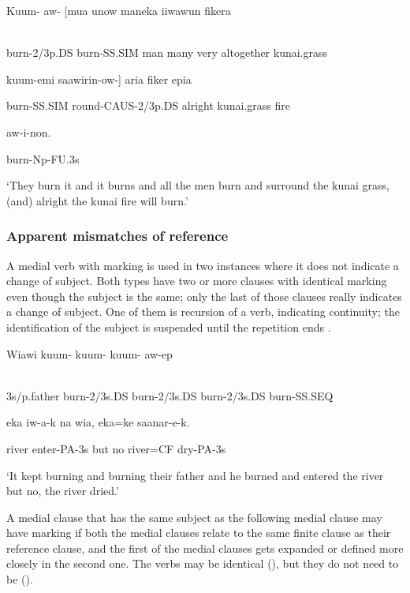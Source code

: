 \ea%
\label{ex:x1479}
\gll Kuum-  aw-  [mua  unow  maneka  iiwawun  fikera \\
      \\
\glt
\z

burn-2/3p.DS  burn-SS.SIM  man  many  very  altogether  kunai.grass

kuum-emi  saawirin-ow-]  aria  fiker  epia

burn-SS.SIM  round-CAUS-2/3p.DS  alright  kunai.grass  fire

aw-i-non.

burn-Np-FU.3s

`They burn it and it burns and all the men burn and surround the kunai grass, (and) alright the kunai fire will burn.'

\subsubsection[Apparent mismatches of reference]{Apparent mismatches of reference}
\hypertarget{RefHeading23221935131865}{}
A medial verb with  marking is used in two instances where it does not indicate a change of subject. Both types have two or more clauses with identical  marking even though the subject is the same; only the last of those clauses really indicates a change of subject. One of them is recursion of a  verb, indicating continuity; the identification of the subject is suspended until the repetition ends \citep[201]{Reesink1987}. 

\ea%
\label{ex:x1493}
\gll Wiawi  kuum-  kuum-  kuum-  aw-ep  \\
      \\
\glt
\z

3s/p.father  burn-2/3s.DS  burn-2/3s.DS  burn-2/3s.DS  burn-SS.SEQ

eka  iw-a-k  na  wia,  eka=ke  saanar-e-k.

river  enter-PA-3s  but  no  river=CF  dry-PA-3s

`It kept burning and burning their father and he burned and entered the river but no, the river dried.'

A medial clause that has the same subject as the following medial clause may have  marking if both the medial clauses relate to the same finite clause as their reference clause, and the first of the medial clauses gets expanded or defined more closely in the second one. The  verbs may be identical (), but they do not need to be ().

